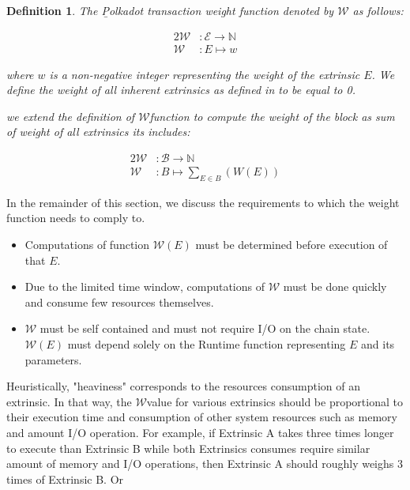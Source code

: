 \documentclass[11pt,a4paper]{article}
\newtheorem{definition}{Definition}
\newcommand{\TWF}{\ensuremath{\mathcal{W}}}
\begin{document}
\begin{definition}
  \label{defn:weight-function}
  The {\b Polkadot transaction weight function} denoted by $\mathcal{W}$ as follows:

  \begin{alignat*}{2}
    \mathcal{W} &: \mathcal{E} \rightarrow \mathbb{N} \\
    \mathcal{W} &: E \mapsto w
  \end{alignat*}

  where $w$ is a non-negative integer representing the weight of the extrinsic $E$. We define the weight of all inherent extrinsics as defined in \cite[Definition~3.3]{web30_technologies_foundation_polkadot_2020} to be equal to 0.

  we extend the definition of \TWF function to compute the weight of the block as sum of weight of all extrinsics its includes:

  \begin{alignat*}{2}
    \mathcal{W} &: \mathcal{B}\rightarrow \mathbb{N} \\
    \mathcal{W} &: B \mapsto \sum_{E\in B}(W(E))
  \end{alignat*}
  
\end{definition}

In the remainder of this section, we discuss the requirements to which the weight function needs to comply to.

\begin{itemize}

\item Computations of function $\mathcal{W}(E)$  must be determined before execution of that $E$.

\item Due to the limited time window, computations of $\TWF$ must be done quickly and consume
      few resources themselves.
\item $\TWF$ must be self contained and must not require I/O on the chain state. $\TWF(E)$
must depend solely on the Runtime function representing $E$ and its parameters.

\end{itemize}

Heuristically, "heaviness" corresponds to the resources consumption of an extrinsic. In that way, the \TWF value for various extrinsics should be proportional to their execution time and consumption of other system resources such as memory and amount I/O operation. For example, if Extrinsic A takes three times longer to execute than Extrinsic B while both Extrinsics consumes require similar amount of memory and I/O operations, then Extrinsic A should roughly weighs 3 times of Extrinsic B. Or
\end{document}
